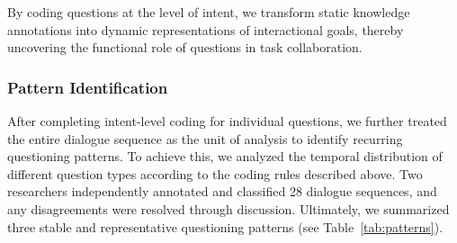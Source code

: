 \documentclass[sigconf,authordraft]{acmart}
\begin{document}
By coding questions at the level of intent, we transform static knowledge annotations into dynamic representations of interactional goals, thereby uncovering the functional role of questions in task collaboration.


\subsubsection{Pattern Identification}
After completing intent-level coding for individual questions, we further treated the entire dialogue sequence as the unit of analysis to identify recurring questioning patterns. To achieve this, we analyzed the temporal distribution of different question types according to the coding rules described above. Two researchers independently annotated and classified 28 dialogue sequences, and any disagreements were resolved through discussion. Ultimately, we summarized three stable and representative questioning patterns (see Table~\ref{tab:patterns}). 
\end{document}
